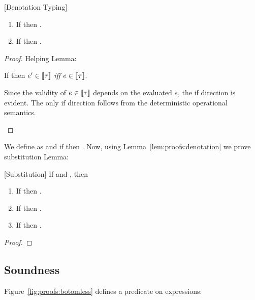 \begin{lemma}{[Denotation Typing]}\label{lem:proofs:denotation}
\begin{enumerate}
\item If  then . 
\item If  then .
\end{enumerate}
\end{lemma} 
\begin{proof}
Helping Lemma:
\begin{lemma}\label{lemma:closesem}
If  then $e' \in [\![\tau]\!]$ \textit{iff} $e \in [\![\tau]\!]$.
\end{lemma}
\begin{proofsketch}
Since the validity of $e \in [\![\tau]\!]$ depends on the evaluated $e$, 
the if direction is evident.
The only if direction follows from the deterministic operational semantics.
\end{proofsketch}


\end{proof}

We define \iswellformed{}{\Gamma}
as \iswellformed{}{\emptyset} and if \iswellformed{\Gamma}{\tau} then .
Now, using Lemma~\ref{lem:proofs:denotation} we prove substitution Lemma:
\begin{lemma}{[Substitution]}\label{lemma:substitution}
If  and , then 
\begin{enumerate}
\item If 
	then
	.
\item If 
	then
	.
\item If 
	then
	.
\end{enumerate}
\end{lemma}
\begin{proof}

\end{proof}


\subsection{Soundness}
Figure~\ref{fig:proofs:botomless} defines a \botomless{\bullet} predicate on expressions:

